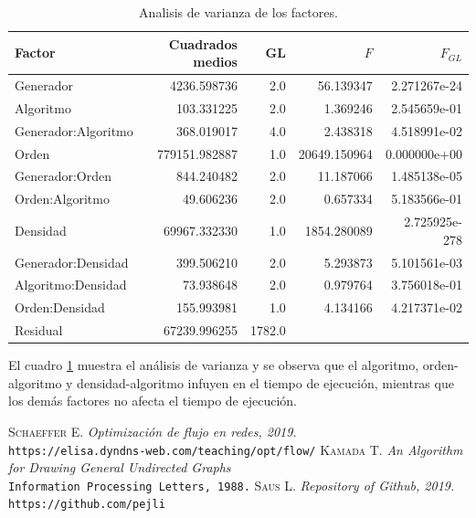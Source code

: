 \documentclass[12pt, a4paper]{article}
\begin{document}
\begin{table}[H]
\begin{center} \begin{tabular}{|lrrrr|}
\hline
Factor & Cuadrados medios & GL & $F$ & $F_{GL}$ \\ \hline \hline
Generador           &   4236.598736  &    2.0 &     56.139347 &   2.271267e-24 \\ \hline
Algoritmo           &    103.331225  &    2.0 &      1.369246 &   2.545659e-01 \\ \hline
Generador:Algoritmo &    368.019017  &    4.0 &      2.438318 &   4.518991e-02 \\
Orden               & 779151.982887  &    1.0 &  20649.150964 &   0.000000e+00 \\
Generador:Orden     &    844.240482  &    2.0 &     11.187066 &   1.485138e-05 \\ \hline
Orden:Algoritmo     &     49.606236  &    2.0 &      0.657334 &   5.183566e-01 \\ \hline
Densidad            &  69967.332330  &    1.0 &   1854.280089 &  2.725925e-278 \\
Generador:Densidad  &    399.506210  &    2.0 &      5.293873 &   5.101561e-03 \\ \hline
Algoritmo:Densidad  &     73.938648  &    2.0 &      0.979764 &   3.756018e-01 \\ \hline
Orden:Densidad      &    155.993981  &    1.0 &      4.134166 &   4.217371e-02 \\
Residual            &  67239.996255  & 1782.0 &           	  &            	  \\
\hline
\end{tabular} \end{center}
\caption{Analisis de varianza de los factores.}
\label{tab:resultados}
\end{table}

El cuadro \ref{tab:resultados} muestra el an\'alisis de varianza y se observa que el algoritmo, orden-algoritmo y densidad-algoritmo infuyen en el tiempo de ejecuci\'on, mientras que los dem\'as factores no afecta el tiempo de ejecuci\'on.

\begin{thebibliography}{X}
 \textsc{Schaeffer E.} \textit{Optimización de flujo en redes, 2019.} \\
\texttt{https://elisa.dyndns-web.com/teaching/opt/flow/}
 \textsc{Kamada T.} \textit{An Algorithm for Drawing General Undirected Graphs} \\
\texttt{Information Processing Letters, 1988.}
 \textsc{Saus L.} \textit{Repository of Github, 2019.} \\
\texttt{https://github.com/pejli}
\end{thebibliography}
\end{document}
